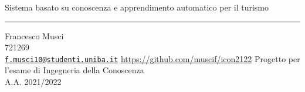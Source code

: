 \documentclass[12pt, a4paper]{extarticle}
\newcommand{\seccolor}{\color{DodgerBlue3}}
\begin{document}
\selectfont
\begin{titlepage}
	\flushright
	\hfill
	\vfill
	{\LARGE Sistema basato su conoscenza e apprendimento automatico per il turismo \par}
	{\seccolor\rule[5pt]{\textwidth}{.8pt} \par}
  {\large Francesco Musci}\\
  721269\\
  \href{mailto:f.musci10@studenti.uniba.it}{\texttt{f.musci10@studenti.uniba.it}}
  \url{https://github.com/muscif/icon2122}
	\vfill
    Progetto per l'esame di Ingegneria della Conoscenza\\
    A.A. 2021/2022
\end{titlepage}
\newpage
\pagestyle{empty}
\
\newpage
\begin{titlepage}
    \tableofcontents
\end{titlepage}

\pagestyle{plain}



\newpage
\printbibliography[heading=bibintoc]
\end{document}
